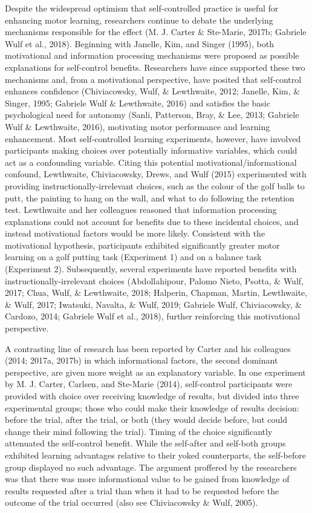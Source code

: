\documentclass[
  english,
  man,floatsintext]{apa7}
\begin{document}
Despite the widespread optimism that self-controlled practice is useful for enhancing motor learning, researchers continue to debate the underlying mechanisms responsible for the effect (M. J. Carter \& Ste-Marie, 2017b; Gabriele Wulf et al., 2018). Beginning with Janelle, Kim, and Singer (1995), both motivational and information processing mechanisms were proposed as possible explanations for self-control benefits. Researchers have since supported these two mechanisms and, from a motivational perspective, have posited that self-control enhances confidence (Chiviacowsky, Wulf, \& Lewthwaite, 2012; Janelle, Kim, \& Singer, 1995; Gabriele Wulf \& Lewthwaite, 2016) and satisfies the basic psychological need for autonomy (Sanli, Patterson, Bray, \& Lee, 2013; Gabriele Wulf \& Lewthwaite, 2016), motivating motor performance and learning enhancement. Most self-controlled learning experiments, however, have involved participants making choices over potentially informative variables, which could act as a confounding variable. Citing this potential motivational/informational confound, Lewthwaite, Chiviacowsky, Drews, and Wulf (2015) experimented with providing instructionally-irrelevant choices, such as the colour of the golf balls to putt, the painting to hang on the wall, and what to do following the retention test. Lewthwaite and her colleagues reasoned that information processing explanations could not account for benefits due to these incidental choices, and instead motivational factors would be more likely. Consistent with the motivational hypothesis, participants exhibited significantly greater motor learning on a golf putting task (Experiment 1) and on a balance task (Experiment 2). Subsequently, several experiments have reported benefits with instructionally-irrelevant choices (Abdollahipour, Palomo Nieto, Psotta, \& Wulf, 2017; Chua, Wulf, \& Lewthwaite, 2018; Halperin, Chapman, Martin, Lewthwaite, \& Wulf, 2017; Iwatsuki, Navalta, \& Wulf, 2019; Gabriele Wulf, Chiviacowsky, \& Cardozo, 2014; Gabriele Wulf et al., 2018), further reinforcing this motivational perspective.

A contrasting line of research has been reported by Carter and his colleagues (2014; 2017a, 2017b) in which informational factors, the second dominant perspective, are given more weight as an explanatory variable. In one experiment by M. J. Carter, Carlsen, and Ste-Marie (2014), self-control participants were provided with choice over receiving knowledge of results, but divided into three experimental groups; those who could make their knowledge of results decision: before the trial, after the trial, or both (they would decide before, but could change their mind following the trial). Timing of the choice significantly attenuated the self-control benefit. While the self-after and self-both groups exhibited learning advantages relative to their yoked counterparts, the self-before group displayed no such advantage. The argument proffered by the researchers was that there was more informational value to be gained from knowledge of results requested after a trial than when it had to be requested before the outcome of the trial occurred (also see Chiviacowsky \& Wulf, 2005).
\end{document}
